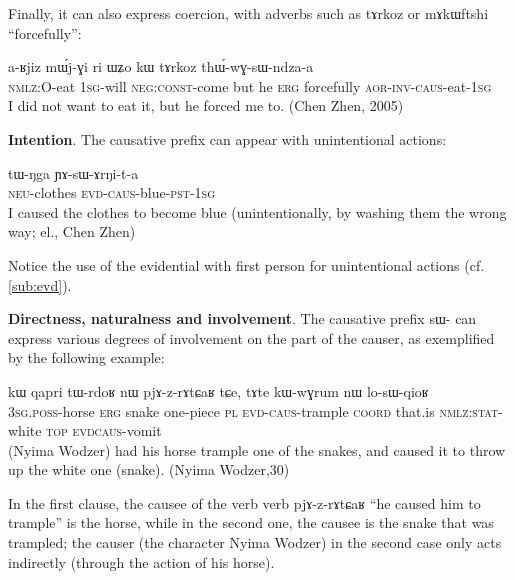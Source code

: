 \documentclass[oldfontcommands,oneside,a4paper,11pt]{memoir}
\newcommand{\ipa}[1]{{\phon #1}} %
\newcommand{\aor}{\textsc{aor}}
\newcommand{\auto}{\textsc{autoben}}
\newcommand{\caus}{\textsc{caus}}
\newcommand{\coord}{\textsc{coord}}
\newcommand{\const}{\textsc{const}}
\newcommand{\erg}{\textsc{erg}}
\newcommand{\evd}{\textsc{evd}}
\newcommand{\inv}{\textsc{inv}}
\newcommand{\negat}{\textsc{neg}}
\newcommand{\neu}{\textsc{neu}}
\newcommand{\nmlz}{\textsc{nmlz}}
\newcommand{\pl}{\textsc{pl}}
\newcommand{\poss}{\textsc{poss}}
\newcommand{\pst}{\textsc{pst}}
\newcommand{\sg}{\textsc{sg}}
\newcommand{\stat}{\textsc{stat}}
\newcommand{\topic}{\textsc{top}}
\begin{document}
Finally, it can also express coercion, with adverbs such as \ipa{tɤrkoz} 	or \ipa{mɤkɯftshi} ``forcefully'':
 \begin{exe}
\ex 
\gll \ipa{kɤ-ndza} 	\ipa{a-ʁjiz} 	\ipa{mɯ́j-ɣi} 	\ipa{ri} 	\ipa{ɯʑo} 	\ipa{kɯ} 	\ipa{tɤrkoz} 	\ipa{thɯ́-wɣ-sɯ-ndza-a} \\
\nmlz{}:O-eat 1\sg{}-will \negat{}:\const{}-come but he \erg{} forcefully \aor{}-\inv{}-\caus{}-eat-1\sg{} \\
 \glt   I did not want to eat it, but he forced me to. (Chen Zhen, 2005)
\end{exe}

 
   \textbf{Intention}. The causative prefix can appear with unintentional actions:
 \begin{exe}
\ex 
\gll 
\ipa{tɯ-ŋga} 	\ipa{ɲɤ-sɯ-ɤrŋi-t-a} \\
	\neu{}-clothes \evd{}-\caus{}-blue-\pst{}-1\sg{} \\
 \glt   I caused the clothes to become blue (unintentionally, by washing them the wrong way; el., Chen Zhen)
\end{exe}
Notice the use of the evidential with first person for unintentional actions (cf. \ref{sub:evd}).
 	

   \textbf{Directness, naturalness and involvement}.  The causative prefix \ipa{sɯ-} can express various degrees of involvement on the part of the causer, as exemplified by the following example:
 
  \begin{exe}
\ex 
\gll \ipa{ɯ-mbro} 	\ipa{kɯ} 	\ipa{qapri} 	\ipa{tɯ-rdoʁ} 	\ipa{nɯ} 	\ipa{pjɤ-z-rɤtɕaʁ} 	\ipa{tɕe,} 	\ipa{tɤte} 	\ipa{kɯ-wɣrum} 	\ipa{nɯ} 	\ipa{lo-sɯ-qioʁ} \\
3\sg{}.\poss{}-horse \erg{} snake one-piece \pl{} \evd{}-\caus{}-trample \coord{} that.is \nmlz{}:\stat{}-white \topic{} \evd{}\caus{}-vomit \\
 \glt  (Nyima Wodzer) had his horse trample one of the snakes, and caused it to throw up the white one (snake). (Nyima Wodzer,30)
\end{exe}
In the first  clause, the causee of the verb verb \ipa{pjɤ-z-rɤtɕaʁ} 	``he caused him to trample'' is the horse, while in the second one, the causee is the snake that was trampled; the causer (the character Nyima Wodzer) in the second case only acts indirectly (through the action of his horse).
 
\end{document}
